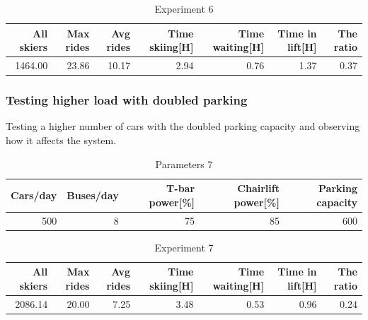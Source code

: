 \documentclass[11pt,a4paper]{article}
\begin{document}
\begin{table}[H]
    \centering
    \begin{tabular}{|r|r|r|r|r|r|r|}
        \hline
        \textbf{All skiers} &\textbf{Max rides} & \textbf{Avg rides} 
            & Time skiing[H] & Time waiting[H] & Time in lift[H]
            & \textbf{The ratio} \\ \hline

        1464.00 & 23.86 & 10.17 & 2.94 & 0.76 & 1.37 & 0.37  \\ \hline
    \end{tabular}

    \caption{Experiment 6}
    \label{table:experiment6}
\end{table}


\subsubsection{Testing higher load with doubled parking}
Testing a higher number of cars with the doubled parking capacity and observing how it affects the system.
\begin{table}[H]
		\centering
		\begin{tabular}{|r|r|r|r|r|}
			\hline
			\textbf{Cars/day} &\textbf{Buses/day} & \textbf{T-bar power[\%]} 
				& \textbf{Chairlift power[\%]} & \textbf{Parking capacity} \\ \hline

			 500 & 8 & 75 & 85& 600\\ \hline
		\end{tabular}

		\caption{Parameters 7}
		\label{table:param7}
	\end{table}


\begin{table}[H]
    \centering
    \begin{tabular}{|r|r|r|r|r|r|r|}
        \hline
        \textbf{All skiers} &\textbf{Max rides} & \textbf{Avg rides} 
            & Time skiing[H] & Time waiting[H] & Time in lift[H]
            & \textbf{The ratio} \\ \hline

        2086.14 & 20.00 & 7.25 & 3.48 & 0.53 & 0.96 & 0.24  \\ \hline 
    \end{tabular}

    \caption{Experiment 7}
    \label{table:experiment7}
\end{table}
\end{document}
